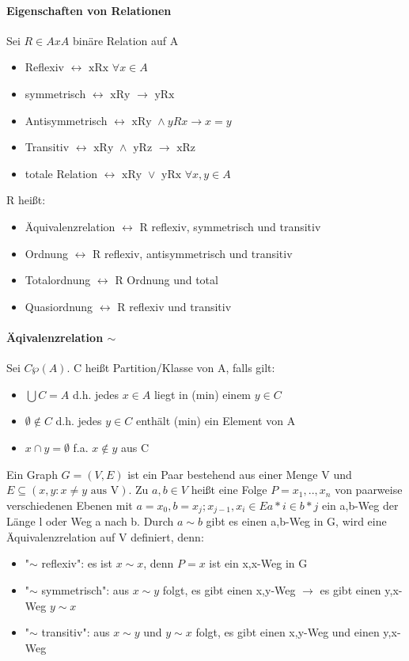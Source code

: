 \documentclass[10pt,landscape]{article}
\begin{document}
\begin{multicols}{3}
\paragraph{Eigenschaften von Relationen}
Sei $R\in AxA$ binäre Relation auf A
\begin{itemize}
    \item Reflexiv $\leftrightarrow \text{ xRx } \forall x \in A$
    \item symmetrisch $\leftrightarrow \text{ xRy } \rightarrow \text{ yRx }$
    \item Antisymmetrisch $\leftrightarrow \text{ xRy } \wedge yRx \rightarrow x=y$
    \item Transitiv $\leftrightarrow \text{ xRy } \wedge \text{ yRz } \rightarrow \text{ xRz }$
    \item totale Relation $\leftrightarrow \text{ xRy } \vee \text{ yRx }  \forall x,y \in A$
\end{itemize}
R heißt:
\begin{itemize}
    \item Äquivalenzrelation $\leftrightarrow$ R reflexiv, symmetrisch und transitiv
    \item Ordnung $\leftrightarrow$ R reflexiv, antisymmetrisch und transitiv
    \item Totalordnung $\leftrightarrow$ R Ordnung und total
    \item Quasiordnung $\leftrightarrow$ R reflexiv und transitiv
\end{itemize}

\paragraph{Äqivalenzrelation $\sim$}
Sei $C\wp (A)$. C heißt Partition/Klasse von A, falls gilt:
\begin{itemize}
    \item $\bigcup C=A$ d.h. jedes $x\in A$ liegt in (min) einem $y\in C$
    \item $\emptyset \not \in C$ d.h. jedes $y\in C$ enthält (min) ein Element von A
    \item $x \cap y = \emptyset$ f.a. $x\not \in y$ aus C
\end{itemize}

Ein Graph $G=(V,E)$ ist ein Paar bestehend aus einer Menge V und $E\subseteq (x,y: x \not = y \text{ aus V} )$.
Zu $a,b\in V$ heißt eine Folge $P=x_1,..,x_n$ von paarweise verschiedenen Ebenen mit $a=x_0, b=x_j; x_{j-1},x_i \in E{a*i \in b*j}$ ein a,b-Weg der Länge l oder Weg a nach b. Durch $a\sim b$ gibt es einen a,b-Weg in G, wird eine Äquivalenzrelation auf V definiert, denn:
\begin{itemize}
    \item "$\sim$ reflexiv": es ist $x\sim x$, denn $P=x$ ist ein x,x-Weg in G
    \item "$\sim$ symmetrisch": aus $x\sim y$ folgt, es gibt einen x,y-Weg $\rightarrow$ es gibt einen y,x-Weg $y\sim x$
    \item "$\sim$ transitiv": aus $x\sim y$ und $y\sim x$ folgt, es gibt einen x,y-Weg und einen y,x-Weg
\end{itemize}


\end{multicols}
\end{document}
